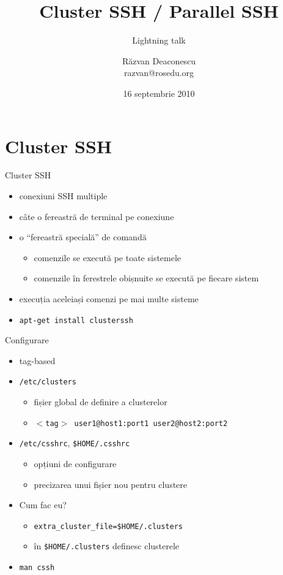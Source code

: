 \documentclass{simple}
\title[Cluster SSH / Parallel SSH]{Cluster SSH / Parallel SSH}
\subtitle{Lightning talk}
\institute{Întâlnirile lunare RLUG -- Septembrie 2010}
\author[Răzvan Deaconescu]{Răzvan Deaconescu\\
	razvan@rosedu.org}
\date{16 septembrie 2010}
\begin{document}
\frame{\titlepage}

\section{Cluster SSH}

\frame{\tableofcontents[currentsection]}

\begin{frame}{Cluster SSH}
	\begin{itemize}		%
		\item conexiuni SSH multiple
		\item câte o fereastră de terminal pe conexiune
		\item o ``fereastră specială'' de comandă
			\begin{itemize}
				\item comenzile se execută pe toate sistemele
				\item comenzile în ferestrele obișnuite se execută pe fiecare
				sistem
			\end{itemize}
		\item execuția aceleiași comenzi pe mai multe sisteme
		\item \texttt{apt-get install clusterssh}
	\end{itemize}
\end{frame}

\begin{frame}{Configurare}
	\begin{itemize}
		\item tag-based
		\item \texttt{/etc/clusters}
			\begin{itemize}
				\item fișier global de definire a clusterelor
				\item \texttt{$<$tag$>$ user1@host1:port1 user2@host2:port2}
			\end{itemize}
		\item \texttt{/etc/csshrc}, \texttt{\$HOME/.csshrc}
			\begin{itemize}
				\item opțiuni de configurare
				\item precizarea unui fișier nou pentru clustere
			\end{itemize}
		\item Cum fac eu?
			\begin{itemize}
				\item \texttt{extra\_cluster\_file=\$HOME/.clusters}
				\item în \texttt{\$HOME/.clusters} definesc clusterele
			\end{itemize}
		\item \texttt{man cssh}
	\end{itemize}
\end{frame}
\end{document}
